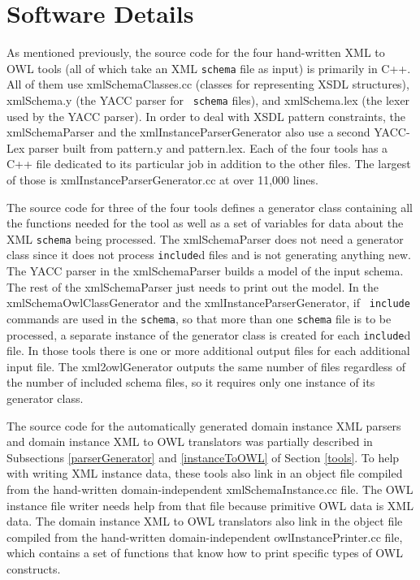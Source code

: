 \documentclass[preprint,12pt]{elsarticle}
\begin{document}
\section{Software Details}
\label{softwareDetails}

As mentioned previously, the source code for the four hand-written XML to
OWL tools (all of which take an XML {\tt schema} file as input) is
primarily in C++. All of them use xmlSchemaClasses.cc (classes for
representing XSDL structures), xmlSchema.y (the YACC parser for {\tt
  schema} files), and xmlSchema.lex (the lexer used by the YACC parser). In
order to deal with XSDL pattern constraints, the xmlSchemaParser and the
xmlInstanceParserGenerator also use a second YACC-Lex parser built from
pattern.y and pattern.lex. Each of the four tools has a C++ file dedicated
to its particular job in addition to the other files. The largest of those
is xmlInstanceParserGenerator.cc at over 11,000 lines.

The source code for three of the four tools defines a generator class
containing all the functions needed for the tool as well as a set of
variables for data about the XML {\tt schema} being processed. The
xmlSchemaParser does not need a generator class since it does not process
{\tt include}d files and is not generating anything new. The YACC parser in
the xmlSchemaParser builds a model of the input schema. The rest of the
xmlSchemaParser just needs to print out the model. In the
xmlSchemaOwlClassGenerator and the xmlInstanceParserGenerator, if {\tt
  include} commands are used in the {\tt schema}, so that more than one
{\tt schema} file is to be processed, a separate instance of the generator
class is created for each {\tt include}d file. In those tools there is one
or more additional output files for each additional input file. The
xml2owlGenerator outputs the same number of files regardless of the number
of included schema files, so it requires only one instance of its generator
class.

The source code for the automatically generated domain instance XML parsers
and domain instance XML to OWL translators was partially described in
Subsections \ref{parserGenerator} and \ref{instanceToOWL} of Section
\ref{tools}. To help with writing XML instance data, these tools also
link in an object file compiled from the hand-written domain-independent
xmlSchemaInstance.cc file. The OWL instance file writer needs help from
that file because primitive OWL data is XML data. The domain instance XML
to OWL translators also link in the object file compiled from the
hand-written domain-independent owlInstancePrinter.cc file, which contains
a set of functions that know how to print specific types of OWL constructs.
\end{document}
